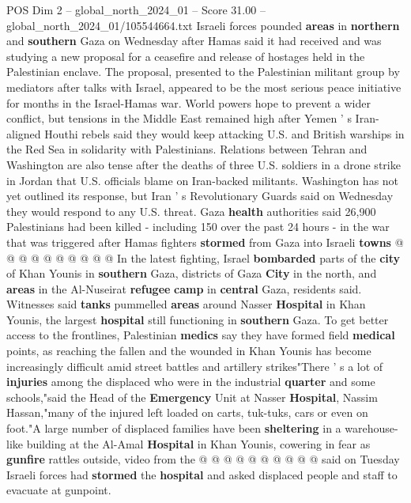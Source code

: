 \begin{textsample}{POS Dim 2 – global\_north\_2024\_01 – Score 31.00 – global\_north\_2024\_01/105544664.txt}  \label{ex:f2_pos_207}
Israeli forces pounded \textbf{areas} in \textbf{northern} and \textbf{southern} Gaza on Wednesday after Hamas said it had received and was studying a new proposal for a ceasefire and release of hostages held in the Palestinian enclave.
The proposal, presented to the Palestinian militant group by mediators after talks with Israel, appeared to be the most serious peace initiative for months in the Israel-Hamas war.
World powers hope to prevent a wider conflict, but tensions in the Middle East remained high after Yemen ' s Iran-aligned Houthi rebels said they would keep attacking U.S. and British warships in the Red Sea in solidarity with Palestinians.
Relations between Tehran and Washington are also tense after the deaths of three U.S. soldiers in a drone strike in Jordan that U.S. officials blame on Iran-backed militants.
Washington has not yet outlined its response, but Iran ' s Revolutionary Guards said on Wednesday they would respond to any U.S. threat.
Gaza \textbf{health} authorities said 26,900 Palestinians had been killed - including 150 over the past 24 hours - in the war that was triggered after Hamas fighters \textbf{stormed} from Gaza into Israeli \textbf{towns} @ @ @ @ @ @ @ @ @ @ In the latest fighting, Israel \textbf{bombarded} parts of the \textbf{city} of Khan Younis in \textbf{southern} Gaza, districts of Gaza \textbf{City} in the north, and \textbf{areas} in the Al-Nuseirat \textbf{refugee} \textbf{camp} in \textbf{central} Gaza, residents said.
Witnesses said \textbf{tanks} pummelled \textbf{areas} around Nasser \textbf{Hospital} in Khan Younis, the largest \textbf{hospital} still functioning in \textbf{southern} Gaza.
To get better access to the frontlines, Palestinian \textbf{medics} say they have formed field \textbf{medical} points, as reaching the fallen and the wounded in Khan Younis has become increasingly difficult amid street battles and artillery strikes"There ' s a lot of \textbf{injuries} among the displaced who were in the industrial \textbf{quarter} and some schools,"said the Head of the \textbf{Emergency} Unit at Nasser \textbf{Hospital}, Nassim Hassan,"many of the injured left loaded on carts, tuk-tuks, cars or even on foot."A large number of displaced families have been \textbf{sheltering} in a warehouse-like building at the Al-Amal \textbf{Hospital} in Khan Younis, cowering in fear as \textbf{gunfire} rattles outside, video from the @ @ @ @ @ @ @ @ @ @ said on Tuesday Israeli forces had \textbf{stormed} the \textbf{hospital} and asked displaced people and staff to evacuate at gunpoint.

\end{textsample}
